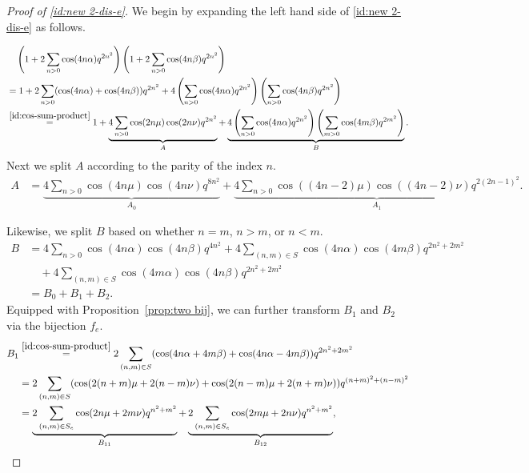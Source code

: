 \documentclass[11pt,reqno]{amsart}
\numberwithin{equation}{section}
\theoremstyle{plain}
\theoremstyle{definition}
\theoremstyle{named}
\begin{document}
\begin{proof}[Proof of \eqref{id:new 2-dis-e}]
We begin by expanding the left hand side of  \eqref{id:new 2-dis-e} as follows.

\begin{align*}
&\quad \left(1+2\sum_{n>0}\cos(4n\alpha)q^{2n^2}\right)\left(1+2\sum_{n>0}\cos(4n\beta)q^{2n^2}\right)\nonumber\\ 
&= 1+2\sum_{n>0}(\cos(4n\alpha)+\cos(4n\beta))q^{2n^2}+4\left(\sum_{n>0}\cos(4n\alpha)q^{2n^2}\right)\left(\sum_{n>0}\cos(4n\beta)q^{2n^2}\right)\\
&\stackrel{\eqref{id:cos-sum-product}}{=} 1+\underbrace{4\sum_{n>0}\cos(2n\mu)\cos(2n\nu)q^{2n^2}}_{A}+\underbrace{4\left(\sum_{n>0}\cos(4n\alpha)q^{2n^2}\right)\left(\sum_{m>0}\cos(4m\beta)q^{2m^2}\right)}_{B}.
\end{align*}
Next we split $A$ according to the parity of the index $n$.
\begin{align*}
A &= \underbrace{4\sum_{n>0}\cos(4n\mu)\cos(4n\nu)q^{8n^2}}_{A_0}+\underbrace{4\sum_{n>0}\cos((4n-2)\mu)\cos((4n-2)\nu)q^{2(2n-1)^2}}_{A_1}.
\end{align*}

Likewise, we split $B$ based on whether $n=m$, $n>m$, or $n<m$.
\begin{align*}
B &= 4\sum_{n>0}\cos(4n\alpha)\cos(4n\beta)q^{4n^2}+4\sum_{(n,m)\in S}\cos(4n\alpha)\cos(4m\beta)q^{2n^2+2m^2}\\
&\quad +4\sum_{(n,m)\in S}\cos(4m\alpha)\cos(4n\beta)q^{2n^2+2m^2}\\
&=B_0+B_1+B_2.
\end{align*}
Equipped with Proposition~\ref{prop:two bij}, we can further transform $B_1$ and $B_2$ via the bijection $f_e$.
\begin{align*}
B_1 &\stackrel{\eqref{id:cos-sum-product}}{=} 2\sum_{(n,m)\in S}(\cos(4n\alpha+4m\beta)+\cos(4n\alpha-4m\beta))q^{2n^2+2m^2}\\
&= 2\sum_{(n,m)\in S}(\cos(2(n+m)\mu+2(n-m)\nu)+\cos(2(n-m)\mu+2(n+m)\nu))q^{(n+m)^2+(n-m)^2}\\
&= \underbrace{2\sum_{(n,m)\in S_e}\cos(2n\mu+2m\nu)q^{n^2+m^2}}_{B_{11}}+\underbrace{2\sum_{(n,m)\in S_e}\cos(2m\mu+2n\nu)q^{n^2+m^2}}_{B_{12}},
\end{align*}


\end{proof}
\end{document}
